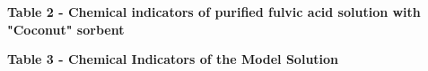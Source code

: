 {\bfseries Table 2 - Chemical indicators of purified fulvic acid solution
with "Coconut" sorbent}

% 
% 
% 
% 
% 
% 
% 
% 
% 
% 
% 
% 

{\bfseries Table 3 - Chemical Indicators of the Model Solution}

